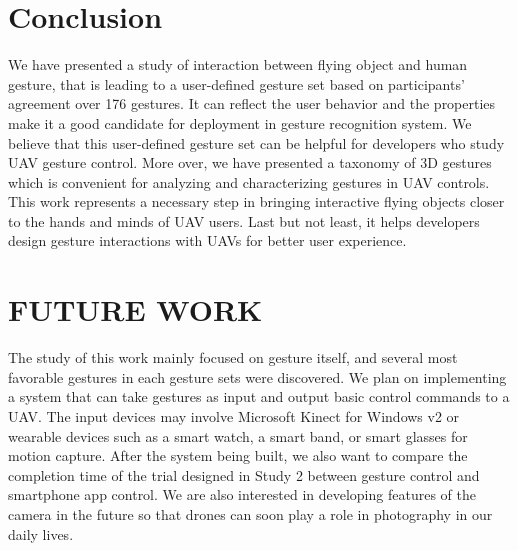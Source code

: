 \documentclass{sigchi}
\begin{document}




\section{Conclusion}

We have presented a study of interaction between flying object and  human gesture, that is leading to a user-defined gesture set based on participants' agreement over 176 gestures. It can reflect the user behavior and the properties make it a good candidate for deployment in gesture recognition system. We believe that this user-defined gesture set can be helpful for developers who study UAV gesture control. More over, we have presented a taxonomy of 3D gestures which is convenient for analyzing and characterizing gestures in UAV controls. This work represents a necessary step in bringing interactive flying objects closer to the hands and minds of UAV users. Last but not least, it helps developers design gesture interactions with UAVs for better user experience. 


\section{FUTURE WORK}

The study of this work mainly focused on gesture itself, and several most favorable gestures in each gesture sets were discovered. We plan on implementing a system that can take gestures as input and output basic control commands to a UAV. The input devices may involve Microsoft Kinect for Windows v2 or wearable devices such as a smart watch, a smart band, or smart glasses for motion capture. After the system being built, we also want to compare the completion time of the trial designed in Study 2 between gesture control and smartphone app control. We are also interested in developing features of the camera in the future so that drones can soon play a role in photography in our daily lives.
\end{document}
